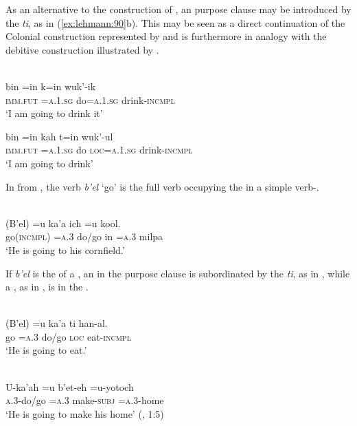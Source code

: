\documentclass[output=paper]{langsci/langscibook}
\begin{document}
As an alternative to the construction of , an  purpose clause may be introduced by the  \textit{ti}, as in (\ref{ex:lehmann:90}b). This may be seen as a direct continuation of the Colonial construction represented by  and is furthermore in analogy with the debitive construction illustrated by .

\ea\label{ex:lehmann:90}
\\
    \ea
\gll  bin      =in      k=in        wuk’-ik\\ 
  \textsc{imm.fut } \textsc{=a.1.sg}   do=\textsc{a.1.sg}   drink-\textsc{incmpl}\\
\glt ‘I am going to drink it’

\ex
\gll  bin      =in      kah  t=in        wuk’-ul\\
\textsc{imm.fut } \textsc{=a.1.sg}   do    \textsc{loc=a.1.sg}  drink-\textsc{incmpl}\\
\glt ‘I am going to drink’ \citep[101]{Bruce1968}
\z
\z

In  from , the verb \textit{b’el} ‘go’ is the full verb occupying the  in a simple verb-.

\ea\label{ex:lehmann:91}
\\
\gll        (B’el)      =u    ka’a    ich  =u    kool.\\
  go(\textsc{incmpl) } \textsc{=a.3}    do/go  in    =\textsc{a.3}    milpa\\
\glt ‘He is going to his cornfield.’ \citep[90f]{BriceñoChel2000ir}
\z

If \textit{b’el} is the  of a , an  in the purpose clause is subordinated by the  \textit{ti}, as in , while a , as in , is in the .

\ea\label{ex:lehmann:92}
\\
\gll        (B’el)  =u    ka’a    ti      han-al.\\
  go      =\textsc{a.3}    do/go  \textsc{loc}    eat-\textsc{incmpl}\\
\glt ‘He is going to eat.’ \citep[91]{Bruce1968}
\z

\ea\label{ex:lehmann:93}
 \\
\gll      U-ka'ah    =u    b’et-eh      =u-yotoch\\
  \textsc{a.3}{}-do/go    =\textsc{a.3} make-\textsc{subj } \textsc{=a.3}{}-home\\
\glt `He is going to make his home' (\citealt{Hofling1991}, 1:5)
\z
\end{document}
